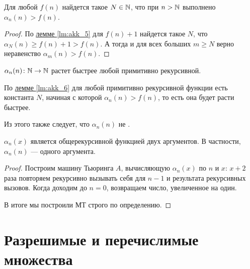 \begin{lm}\label{lm:akk_6}
	Для любой \prf $ f(n)$ найдется такое  $ N \in \mathbb{N}$, что при $ n > \mathbb{N}$ выполнено  $  \alpha _n(n) > f(n)$.
\end{lm}
\begin{proof}
	По \hyperref[lm:akk_5]{лемме \ref{lm:akk_5}} для $ f(n) + 1$ найдется такое $ N$, что $  \alpha _N(n) \ge  f(n) + 1 > f(n)$. А тогда и для всех больших $ m \ge N$ верно неравенство $  \alpha _m(n) > f(n)$.
\end{proof}
\begin{thm}
	$ \alpha _{n}(n) \colon \mathbb{N} \to \mathbb{N}$  растет быстрее любой примитивно рекурсивной.
\end{thm}
\begin{proof*}
	По \hyperref[lm:akk_5]{лемме \ref{lm:akk_6}} для любой примитивно рекурсивной функции есть константа $ N$, начиная с которой  $  \alpha _n(n) > f(n)$, то есть она будет расти быстрее.

	Из этого также следует, что $  \alpha _n(n)$ не \prf.
\end{proof*}
\begin{lm}\label{lm:akk_7}
	$ \alpha _n(x)$ является общерекурсивной функцией двух аргументов. В частности, $  \alpha _n(n)$ --- одного аргумента.
\end{lm}
\begin{proof}
	Построим машину Тьюринга $ A$, вычисляющую $ \alpha _n(x)$ по $ n$ и  $ x$: $ x+2$ раза повторяем рекурсивно вызывать себя для $ n-1$ и результата рекурсивных вызовов. Когда доходим до $ n  = 0$, возвращаем число, увеличенное на один. 

	В итоге мы построили МТ строго по определению.
\end{proof}


\chapter{Разрешимые и перечислимые множества}
